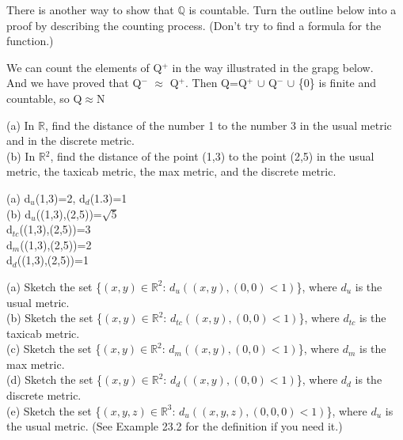 \documentclass[11pt, a4paper, UTF8]{ctexart}
\begin{document}
\begin{problem}[UD:22.9]
There is another way to show that $\mathbb{Q}$ is countable. Turn the outline below into a proof by describing the counting process. (Don't try to find a formula for the function.)
\end{problem}
\begin{solution}
We can count the elements of Q$^{+}$ in the way illustrated in the grapg below.\\
And we have proved that Q$^{-}$ $\approx$ Q$^{+}$. Then Q=Q$^{+}$ $\cup$ Q$^{-}$ $\cup$ \{0\} is finite and countable, so Q$\approx$N\\
\end{solution}


\begin{problem}[UD:23.2]
(a) In $\mathbb{R}$, find the distance of the number 1 to the number 3 in the usual metric and in the discrete metric.\\
(b) In $\mathbb{R}$$^2$, find the distance of the point (1,3) to the point (2,5) in the usual metric, the taxicab metric, the max metric, and the discrete metric.
\end{problem}
\begin{solution}
(a) d$_{u}$(1,3)=2, d$_{d}$(1.3)=1\\
(b) d$_{u}$((1,3),(2,5))=$\sqrt{5}$\\
d$_{tc}$((1,3),(2,5))=3\\
d$_{m}$((1,3),(2,5))=2\\
d$_{d}$((1,3),(2,5))=1\\
\end{solution}



\begin{problem}[UD:23.3]
(a) Sketch the set \{$(x,y)\in \mathbb{R}^2$: $d_u((x,y),(0,0)<1)$\}, where $d_u$ is the usual metric.\\
(b) Sketch the set \{$(x,y)\in \mathbb{R}^2$: $d_{tc}((x,y),(0,0)<1)$\}, where $d_{tc}$ is the taxicab metric.\\
(c) Sketch the set \{$(x,y)\in \mathbb{R}^2$: $d_m((x,y),(0,0)<1)$\}, where $d_m$ is the max metric.\\
(d) Sketch the set \{$(x,y)\in \mathbb{R}^2$: $d_d((x,y),(0,0)<1)$\}, where $d_d$ is the discrete metric.\\
(e) Sketch the set \{$(x,y,z)\in \mathbb{R}^3$: $d_u((x,y,z),(0,0,0)<1)$\}, where $d_u$ is the usual metric. (See Example 23.2 for the definition if you need it.)\\
\end{problem}
\begin{solution}
\end{solution}
\end{document}
